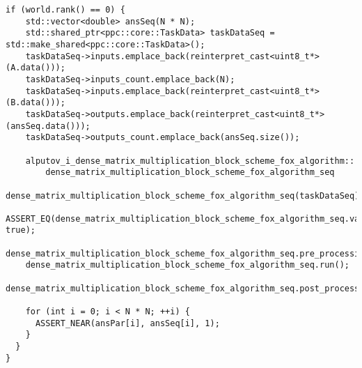 \documentclass{report}
\begin{document}
\begin{lstlisting}[caption={main.cpp(func tests)},label=lst:opsmpi2]
  if (world.rank() == 0) {
    std::vector<double> ansSeq(N * N);
    std::shared_ptr<ppc::core::TaskData> taskDataSeq = std::make_shared<ppc::core::TaskData>();
    taskDataSeq->inputs.emplace_back(reinterpret_cast<uint8_t*>(A.data()));
    taskDataSeq->inputs_count.emplace_back(N);
    taskDataSeq->inputs.emplace_back(reinterpret_cast<uint8_t*>(B.data()));
    taskDataSeq->outputs.emplace_back(reinterpret_cast<uint8_t*>(ansSeq.data()));
    taskDataSeq->outputs_count.emplace_back(ansSeq.size());

    alputov_i_dense_matrix_multiplication_block_scheme_fox_algorithm::
        dense_matrix_multiplication_block_scheme_fox_algorithm_seq
            dense_matrix_multiplication_block_scheme_fox_algorithm_seq(taskDataSeq);
    ASSERT_EQ(dense_matrix_multiplication_block_scheme_fox_algorithm_seq.validation(), true);
    dense_matrix_multiplication_block_scheme_fox_algorithm_seq.pre_processing();
    dense_matrix_multiplication_block_scheme_fox_algorithm_seq.run();
    dense_matrix_multiplication_block_scheme_fox_algorithm_seq.post_processing();

    for (int i = 0; i < N * N; ++i) {
      ASSERT_NEAR(ansPar[i], ansSeq[i], 1);
    }
  }
}
\end{lstlisting}
\end{document}
